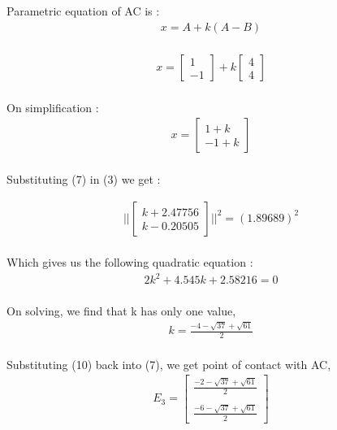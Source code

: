 \documentclass[journal,12pt,twocolumn]{IEEEtran}
\theoremstyle{remark}
\begin{document}
\begin{flushleft}
	Parametric equation of AC is :
	\begin{align}
		x = A + k(A-B)
	\end{align}\\
	\begin{align}
		x = \begin{bmatrix}
			1\\
			-1
		\end{bmatrix}
		+ k\begin{bmatrix}
			4\\
			4
		\end{bmatrix}
	\end{align}\\

	On simplification : 
	\begin{align}
		x = \begin{bmatrix}
			1+k\\
			-1+k
		\end{bmatrix}
	\end{align}\\

	Substituting (7) in (3) we get :

	\begin{align}
		\lvert \lvert 
			\begin{bmatrix}
				k+2.47756\\
				k-0.20505
			\end{bmatrix}
		\rvert \rvert ^2 = (1.89689)^2
	\end{align}\\

	Which gives us the following quadratic equation :
	\begin{align}
		2k^2 + 4.545k + 2.58216 = 0
	\end{align}\\

	On solving, we find that k has only one value,
	\begin{align}
		k = \frac{-4-\sqrt{37}+\sqrt{61}}{2}
	\end{align}\\

	Substituting (10) back into (7), we get point of contact with AC,
	\begin{align}
		{E}_3 = \begin{bmatrix}
			\frac{-2-\sqrt{37}+\sqrt{61}}{2}\\ \\
			\frac{-6-\sqrt{37}+\sqrt{61}}{2}
		\end{bmatrix}
	\end{align}\\


\end{flushleft}
\end{document}
